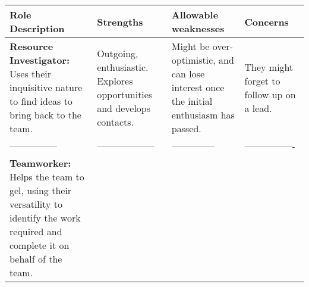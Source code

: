 \documentclass[]{book}
\begin{document}
\begin{longtable}[]{@{}llll@{}}
\toprule
\begin{minipage}[b]{0.21\columnwidth}\raggedright
Role Description\strut
\end{minipage} & \begin{minipage}[b]{0.25\columnwidth}\raggedright
Strengths\strut
\end{minipage} & \begin{minipage}[b]{0.20\columnwidth}\raggedright
Allowable weaknesses\strut
\end{minipage} & \begin{minipage}[b]{0.22\columnwidth}\raggedright
Concerns\strut
\end{minipage}\tabularnewline
\midrule
\endhead
\begin{minipage}[t]{0.21\columnwidth}\raggedright
\textbf{Resource Investigator:} Uses their inquisitive nature to find ideas to bring back to the team.\strut
\end{minipage} & \begin{minipage}[t]{0.25\columnwidth}\raggedright
Outgoing, enthusiastic. Explores opportunities and develops contacts.\strut
\end{minipage} & \begin{minipage}[t]{0.20\columnwidth}\raggedright
Might be over-optimistic, and can lose interest once the initial enthusiasm has passed.\strut
\end{minipage} & \begin{minipage}[t]{0.22\columnwidth}\raggedright
They might forget to follow up on a lead.\strut
\end{minipage}\tabularnewline
\begin{minipage}[t]{0.21\columnwidth}\raggedright
---------------\strut
\end{minipage} & \begin{minipage}[t]{0.25\columnwidth}\raggedright
------------------\strut
\end{minipage} & \begin{minipage}[t]{0.20\columnwidth}\raggedright
--------------\strut
\end{minipage} & \begin{minipage}[t]{0.22\columnwidth}\raggedright
----------------\strut
\end{minipage}\tabularnewline
\begin{minipage}[t]{0.21\columnwidth}\raggedright
\textbf{Teamworker:} Helps the team to gel, using their versatility to identify the work required and complete it on behalf of the team.\strut

\end{minipage}
\end{longtable}
\end{document}
